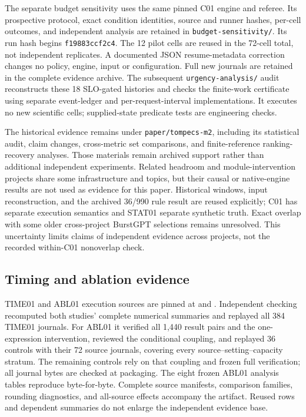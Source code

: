The separate budget sensitivity uses the same pinned C01 engine and
referee. Its prospective protocol, exact condition identities, source and
runner hashes, per-cell outcomes, and independent analysis are retained in
\texttt{budget-sensitivity/}. Its run hash begins \texttt{f19883ccf2c4}.
The 12 pilot cells are reused in the 72-cell total, not independent
replicates. A documented JSON resume-metadata correction changes no policy,
engine, input or configuration. Full new journals are retained in the
complete evidence archive.
The subsequent \texttt{urgency-analysis/} audit reconstructs these 18
SLO-gated histories and checks the finite-work certificate using separate
event-ledger and per-request-interval implementations. It executes no new
scientific cells; supplied-state predicate tests are engineering checks.

The historical evidence remains under \texttt{paper/tompecs-m2}, including
its statistical audit, claim changes, cross-metric set comparisons, and
finite-reference ranking-recovery analyses. Those materials remain archived
support rather than additional independent experiments. Related headroom
and module-intervention projects share some infrastructure and topics, but
their causal or native-engine results are not used as evidence for this
paper. Historical windows, input reconstruction, and the archived 36/990
rule result are reused explicitly; C01 has separate execution semantics
and STAT01 separate synthetic truth. Exact overlap with some older
cross-project BurstGPT selections remains unresolved. This uncertainty
limits claims of independent evidence across projects, not the recorded
within-C01 nonoverlap check.

\FloatBarrier
\subsection{Timing and ablation evidence}
TIME01 and ABL01 execution sources are pinned at
\texttt{} and
\texttt{}.
Independent checking recomputed both studies' complete numerical summaries
and replayed all 384 TIME01 journals. For ABL01 it verified all 1,440 result
pairs and the one-expression intervention, reviewed the conditional coupling,
and replayed 36 controls with their 72 source journals, covering every
source--setting--capacity stratum. The remaining controls rely on that
coupling and frozen full verification; all journal bytes are checked at
packaging. The eight frozen ABL01 analysis tables reproduce byte-for-byte.
Complete source manifests, comparison families, rounding diagnostics, and
all-source effects accompany the artifact. Reused rows and dependent
summaries do not enlarge the independent evidence base.

